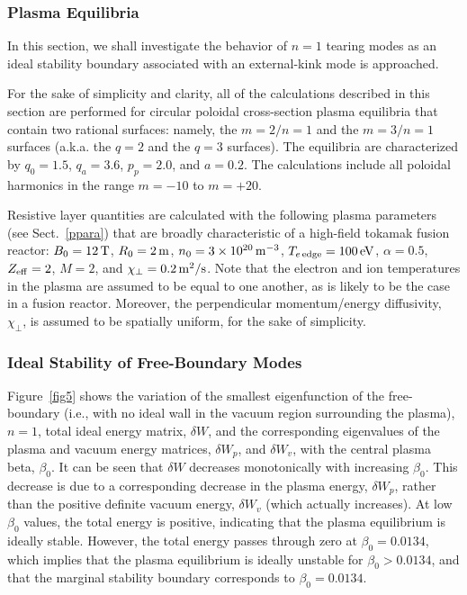 \documentclass[12pt,prb,aps]{revtex4-1}
\begin{document}
\subsubsection{Plasma Equilibria}
In this section, we shall investigate the behavior of $n=1$ tearing modes as an ideal stability boundary associated with an  external-kink mode is approached. 

For the sake of simplicity and clarity, all of the calculations described in this section are performed for circular poloidal cross-section plasma equilibria that contain two rational surfaces: namely, the $m=2/n=1$ and the $m=3/n=1$ surfaces (a.k.a. the $q=2$ and the $q=3$ surfaces). 
The equilibria are characterized by $q_0=1.5$, $q_a=3.6$, $p_p=2.0$, and $a=0.2$. The calculations include all poloidal harmonics in the range $m=-10$ to $m=+20$. 

Resistive layer quantities are calculated with the following plasma parameters (see Sect.~\ref{ppara}) that are broadly characteristic of a high-field tokamak fusion reactor:
$B_0=12\,{\rm T}$, $R_0=2\,{\rm m}$, $n_0=3\times 10^{20}\,{\rm m}^{-3}$, $T_{e\,{\rm edge}}=100\,{\rm eV}$, $\alpha =0.5$, $Z_{\rm eff}=2$, $M=2$, 
and $\chi_\perp=0.2\,{\rm m^2/s}$. Note that the electron and ion temperatures in the plasma are assumed to be equal to one another, as is likely to be the case in a
fusion reactor. Moreover, the
perpendicular momentum/energy diffusivity, $\chi_\perp$, is assumed to be spatially uniform, for the sake of simplicity. 

\subsubsection{Ideal Stability of Free-Boundary Modes}
Figure~\ref{fig5} shows the variation of the smallest eigenfunction of the free-boundary (i.e., with no ideal wall in the vacuum region surrounding the plasma), $n=1$, 
total ideal energy matrix, $\delta W$, and the corresponding eigenvalues of the plasma and vacuum energy matrices, $\delta W_p$, and $\delta W_v$, with the
central plasma beta, $\beta_0$. It can be seen that $\delta W$ decreases monotonically with increasing $\beta_0$. This decrease is due
to a corresponding decrease in the plasma energy, $\delta W_p$, rather than the positive definite vacuum energy, $\delta W_v$ (which actually increases). 
At low $\beta_0$ values, the total energy is positive, indicating that the plasma equilibrium is ideally stable.\cite{freidberg,ideal} However,  the
total energy passes through zero at $\beta_0=0.0134$, which implies that the plasma equilibrium is ideally unstable for $\beta_0>0.0134$,
and that the marginal stability boundary corresponds to $\beta_0=0.0134$. 
\end{document}
